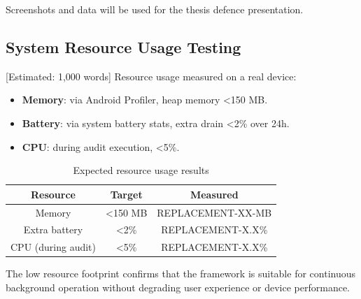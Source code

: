 Screenshots and data will be used for the thesis defence presentation.

\subsection{System Resource Usage Testing} [Estimated: 1,000 words]
Resource usage measured on a real device:
\begin{itemize}
\item \textbf{Memory}: via Android Profiler, heap memory <150 MB.
\item \textbf{Battery}: via system battery stats, extra drain <2\% over 24h.
\item \textbf{CPU}: during audit execution, <5\%.
\end{itemize}

\begin{table}[H]
\centering
\caption{Expected resource usage results}
\begin{tabular}{c|c|c}
\toprule
\textbf{Resource} & \textbf{Target} & \textbf{Measured} \\
\midrule
Memory & <150 MB & REPLACEMENT-XX-MB \\
Extra battery & <2\% & REPLACEMENT-X.X\% \\
CPU (during audit) & <5\% & REPLACEMENT-X.X\% \\
\bottomrule
\end{tabular}
\end{table}

The low resource footprint confirms that the framework is suitable for continuous background operation without degrading user experience or device performance.